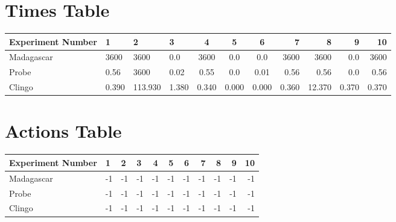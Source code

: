 \documentclass[8pt]{article}
\begin{document}
\begin{landscape}
\section{Times Table}\begin{tabular}{ | l | l | l | l | c | c | c | r | r | r | r | }\hline
Experiment Number & 1 & 2 & 3 & 4 & 5 & 6 & 7 & 8 & 9 & 10\\  \hline
Madagascar & 3600 & 3600 & 0.0 & 3600 & 0.0 & 0.0 & 3600 & 3600 & 0.0 & 3600\\  \hline
Probe & 0.56 & 3600 & 0.02 & 0.55 & 0.0 & 0.01 & 0.56 & 0.56 & 0.0 & 0.56\\  \hline
Clingo & 0.390 & 113.930 & 1.380 & 0.340 & 0.000 & 0.000 & 0.360 & 12.370 & 0.370 & 0.370\\ \hline
\end{tabular}
\section{Actions Table}\begin{tabular}{ | l | l | l | l | c | c | c | r | r | r | r | }\hline
Experiment Number & 1 & 2 & 3 & 4 & 5 & 6 & 7 & 8 & 9 & 10\\ \hline
 Madagascar & -1 & -1 & -1 & -1 & -1 & -1 & -1 & -1 & -1 & -1\\ \hline
 Probe & -1 & -1 & -1 & -1 & -1 & -1 & -1 & -1 & -1 & -1\\ \hline
 Clingo & -1 & -1 & -1 & -1 & -1 & -1 & -1 & -1 & -1 & -1\\ \hline
\end{tabular}
\end{landscape}
\end{document}
